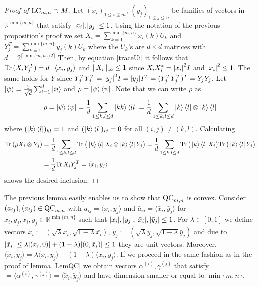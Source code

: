 \begin{proof}[Proof of $ \textup{LC}_{m,n} \supset M $]
Let $ (x_i)_{1 \le i \le m}, \, (y_j)_{1 \le j \le n} $ be families of vectors in $\mathbb{R}^{\min \{ m,n \}}$ that satisfy 
$ {\left|{x_i}\right|},$$ {\left|{y_j}\right|} \le 1 $. 
Using the notation of the previous proposition's proof we set $ X_i = \sum_{k=1}^{\min \{m,n\}} x_i(k)U_k $ and $ Y_j^{T } = \sum_{k=1}^{\min \{m,n\}}y_j(k)U_k $ where the $ U_k $'s are $ d \times d $ matrices with $  d = 2^{\lceil \min \{m,n\}/2 \rceil} $
Then, by equation \ref{traceUi} it follows that $ \textup{Tr} \, {(X_iY_j^T)}  = d\cdot \langle x_i, y_j \rangle  $ and $  \Vert {X_i} \Vert_{\infty} \le 1 $ since $ X_iX_i^* = {\left|{x_i}\right|}^2I $ and $ {\left|{x_i}\right|}^2 \le 1  $. The same holds for $ Y $ since $ Y_j^TY_j^T =   {\left|{y_j}\right|}^2I = {\left|{y_j}\right|}I^T = (Y_j^TY_j^T)^T = Y_jY_j  $.
Let $ \ket{\psi} = \frac{1}{\sqrt{d}}\sum_{i= 1}^{d}\ket{ii} $ and $ \rho = \ket{\psi}\bra{\psi} $. Note that we can write $ \rho $ as
\begin{align*}
\rho = \ket{\psi}\bra{\psi} = \frac{1}{d}\sum_{1 \le k,l \le d}\ket{kk}\bra{ll} = \frac{1}{d} \sum_{1 \le k,l \le d}\ket{k}\bra{l} \otimes \ket{k}\bra{l}
\end{align*}
where $  (\ket{k}\bra{l})_{kl} = 1 $ and $ (\ket{k}\bra{l})_{ij} = 0 $ for all $ (i,j)\neq (k,l) $.
Calculating
\begin{align*}
\textup{Tr} \, {(\rho X_i \otimes Y_j)}  &=\frac{1}{d} \sum_{1 \le k,l \le d} \textup{Tr} \, { \big (\ket{k}\bra{l}X_i \otimes \ket{k}\bra{l}Y_j \big )}  = \frac{1}{d} \sum_{1 \le k,l \le d} \textup{Tr} \, {\big (\ket{k}\bra{l}X_i \big )}  \textup{Tr} \, {\big (\ket{k}\bra{l}Y_j \big )}  \\
&=  \frac{1}{d} \textup{Tr} \, {X_iY_j^T}  = \langle x_i,y_j \rangle
\end{align*}
shows the desired inclusion. 
\end{proof}
\noindent The previous lemma easily enables us to show that $ \textup{QC}_{m,n} $ is convex. Consider $ (a_{ij}), (\bar{a}_{ij}) \in \textup{QC}_{m,n} $ with $ a_{ij} = \langle x_i, y_j \rangle $ and $ \bar{a}_{ij} = \langle \bar{x}_i, \bar{y}_j \rangle $ for $ x_{i},y_j, \bar{x}_i,\bar{y}_j \in \mathbb{R}^{\min \{m,n\}} $ such that $ {\left|{x_i}\right|},{\left|{y_j}\right|}, {\left|{\bar{x}_i}\right|}, {\left|{\bar{y}_j}\right|} \le 1 $.
For $ \lambda \in [0,1] $ we define vectors $\tilde{x}_i:= (\sqrt{\lambda}x_i,\sqrt{1-\lambda}\bar{x_i}), \, \tilde{y}_j:= (\sqrt{\lambda}y_j, \sqrt{1-\lambda}\bar{y}_j) $ and due to  $ {\left|{\tilde{x}_i}\right|} \le \lambda {\left|{(x_i,0)}\right|} + (1-\lambda){\left|{(0,\bar{x}_i)}\right|} \le 1 $ they are unit vectors. Moreover, $ \langle \tilde{x}_i, \tilde{y}_j \rangle = \lambda \langle x_i,y_j \rangle + (1-\lambda) \langle \tilde{x_i},\tilde{y}_j \rangle$. If we proceed in the same fashion as in the proof of lemma \ref{LemQC} we obtain vectors 
$ \alpha^{(i)},\gamma^{(j)} $ that satisfy $= \langle \alpha^{(i)},\gamma^{(j)} \rangle = \langle \tilde{x} _i, \tilde{y}_j\rangle $ and have dimension smaller or equal to $ \min \{m,n\} $.


